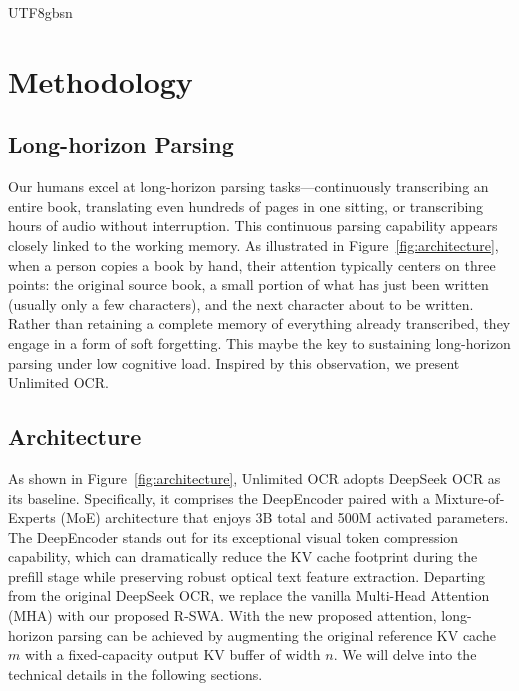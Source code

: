 \documentclass[11pt, a4paper, logo, copyright, nonumbering]{deepseek}
\begin{document}
\begin{CJK*}{UTF8}{gbsn}
\section{Methodology}

\subsection{Long-horizon Parsing}
Our humans excel at long-horizon parsing tasks—continuously transcribing an entire book, translating even hundreds of pages in one sitting, or transcribing hours of audio without interruption. This continuous parsing capability appears closely linked to the working memory. As illustrated in Figure~\ref{fig:architecture}, when a person copies a book by hand, their attention typically centers on three points: the original source book, a small portion of what has just been written (usually only a few characters), and the next character about to be written. Rather than retaining a complete memory of everything already transcribed, they engage in a form of soft forgetting. This maybe the key to sustaining long-horizon parsing under low cognitive load. Inspired by this observation, we present Unlimited OCR.

\subsection{Architecture}

As shown in Figure~\ref{fig:architecture},  Unlimited OCR adopts DeepSeek OCR as its baseline. Specifically, it comprises the DeepEncoder paired with a Mixture-of-Experts (MoE) architecture that enjoys 3B total and 500M activated parameters. The DeepEncoder stands out for its exceptional visual token compression capability, which can dramatically reduce the KV cache footprint during the prefill stage while preserving robust optical text feature extraction. Departing from the original DeepSeek OCR, we replace the vanilla Multi-Head Attention (MHA) with our proposed R-SWA. With the new proposed attention, long-horizon parsing can be achieved by augmenting the original reference KV cache $m$ with a fixed-capacity output KV buffer of width $n$. We will delve into the technical details in the following sections.


\end{CJK*}
\end{document}
